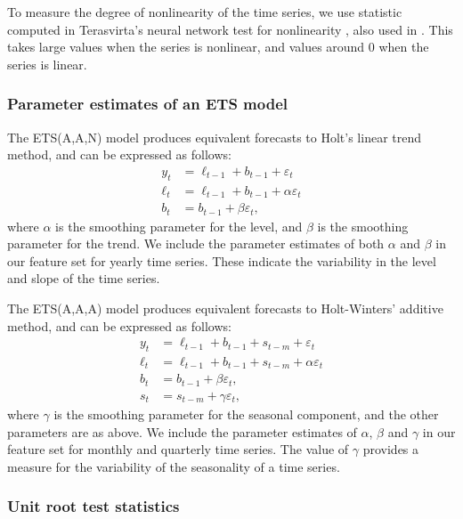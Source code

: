 \documentclass[11pt,a4paper,]{article}
\begin{document}
To measure the degree of nonlinearity of the time series, we use statistic computed in Terasvirta's neural network test for nonlinearity \autocite{nonlintest}, also used in \textcite{wang2009rule}. This takes large values when the series is nonlinear, and values around 0 when the series is linear.

\hypertarget{parameter-estimates-of-an-ets-model}{%
\subsubsection*{Parameter estimates of an ETS model}\label{parameter-estimates-of-an-ets-model}}

The ETS(A,A,N) model \autocite{expsmooth08} produces equivalent forecasts to Holt's linear trend method, and can be expressed as follows:
\begin{align*}
  y_t    & = \ell_{t-1}+b_{t-1}+\varepsilon_t\\
  \ell_t & = \ell_{t-1}+b_{t-1}+\alpha \varepsilon_t\\
  b_t    & = b_{t-1}+\beta \varepsilon_t,
\end{align*}
where \(\alpha\) is the smoothing parameter for the level, and \(\beta\) is the smoothing parameter for the trend. We include the parameter estimates of both \(\alpha\) and \(\beta\) in our feature set for yearly time series. These indicate the variability in the level and slope of the time series.

The ETS(A,A,A) model \autocite{expsmooth08} produces equivalent forecasts to Holt-Winters' additive method, and can be expressed as follows:
\begin{align*}
  y_t    & = \ell_{t-1}+b_{t-1}+s_{t-m}+\varepsilon_t\\
  \ell_t & = \ell_{t-1}+b_{t-1}+s_{t-m}+\alpha \varepsilon_t\\
  b_t    & = b_{t-1}+\beta \varepsilon_t,\\
  s_t &= s_{t-m} + \gamma\varepsilon_t,
\end{align*}
where \(\gamma\) is the smoothing parameter for the seasonal component, and the other parameters are as above. We include the parameter estimates of \(\alpha\), \(\beta\) and \(\gamma\) in our feature set for monthly and quarterly time series. The value of \(\gamma\) provides a measure for the variability of the seasonality of a time series.

\hypertarget{unit-root-test-statistics}{%
\subsubsection*{Unit root test statistics}\label{unit-root-test-statistics}}
\end{document}
